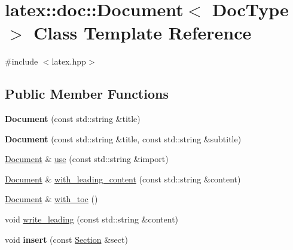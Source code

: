 \hypertarget{classlatex_1_1doc_1_1Document}{\section{latex\-:\-:doc\-:\-:\-Document$<$ \-Doc\-Type $>$ \-Class \-Template \-Reference}
\label{classlatex_1_1doc_1_1Document}
}


{\ttfamily \#include $<$latex.\-hpp$>$}

\subsection*{\-Public \-Member \-Functions}
\begin{DoxyCompactItemize}
\item 
\hypertarget{classlatex_1_1doc_1_1Document_ad03fa7f0d3271370006d20515a3fd5e0}{{\bfseries \-Document} (const std\-::string \&title)}\label{classlatex_1_1doc_1_1Document_ad03fa7f0d3271370006d20515a3fd5e0}

\item 
\hypertarget{classlatex_1_1doc_1_1Document_a95756c45b9f7b684d81920832971e6c1}{{\bfseries \-Document} (const std\-::string \&title, const std\-::string \&subtitle)}\label{classlatex_1_1doc_1_1Document_a95756c45b9f7b684d81920832971e6c1}

\item 
\hyperlink{classlatex_1_1doc_1_1Document}{\-Document} \& \hyperlink{classlatex_1_1doc_1_1Document_a0f449ee90309de24177f4bbc51bcc404}{use} (const std\-::string \&import)
\item 
\hyperlink{classlatex_1_1doc_1_1Document}{\-Document} \& \hyperlink{classlatex_1_1doc_1_1Document_a02070e69275d800b16c25f99725b5363}{with\-\_\-leading\-\_\-content} (const std\-::string \&content)
\item 
\hyperlink{classlatex_1_1doc_1_1Document}{\-Document} \& \hyperlink{classlatex_1_1doc_1_1Document_a42eea3ed819c215c5addf8b10fae4302}{with\-\_\-toc} ()
\item 
void \hyperlink{classlatex_1_1doc_1_1Document_a4225432b9f4e3837c4251c9b97c413c6}{write\-\_\-leading} (const std\-::string \&content)
\item 
\hypertarget{classlatex_1_1doc_1_1Document_a5a00cc1883a91126f7c9779d1c0990db}{void {\bfseries insert} (const \hyperlink{classlatex_1_1doc_1_1Section}{\-Section} \&sect)}\label{classlatex_1_1doc_1_1Document_a5a00cc1883a91126f7c9779d1c0990db}


\end{DoxyCompactItemize}

